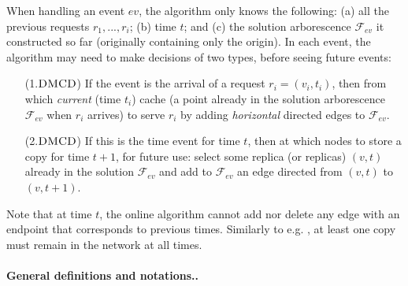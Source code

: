 \documentclass[11pt]{article}
\newcommand{\DMCD}{\mbox{\sc DMCD}}
\newcommand{\calF}{\mathcal{F}}
\begin{document}
When handling an event ${ev}$,
the algorithm only knows the following:
(a) all the previous requests
$r_1,  ..., r_{i}$;
(b) time $t$; and
(c) the solution arborescence $\calF_{ev}$ it constructed so far (originally containing only the origin).
In each event,
the algorithm may need to
make decisions of two types, before seeing future events: \begin{itemize}
\vspace{-0.1cm}

\item [(1.$\DMCD$)] If the event is the arrival of a request $r_i=(v_i,t_i)$, then from which {\em current} (time $t_i$) cache
(a point already in the solution arborescence $\calF_{ev}$ when $r_{i}$ arrives) to serve $r_{i}$
by adding {\em horizontal} directed edges to $\calF_{ev}$.


\item[(2.$\DMCD$)]
If this is the time event for time $t$, then at which nodes to store a copy for time $t+1$, for future use: select some replica (or replicas)
$(v,t)$ already in the solution $\calF_{ev}$ and add to $\calF_{ev}$ an edge directed from $(v,t)$ to  $(v,t+1)$.


\end{itemize}

\noindent Note that at time $t$, the online algorithm cannot add nor delete any edge with an endpoint that corresponds to previous times.
Similarly to e.g. \cite{MAicalp12,papa1,papa2,papa3,halperin},
at least one copy must remain in the network at all times.






\paragraph*{\bf General definitions and notations.\commsingle.\commsingleend}
\end{document}
